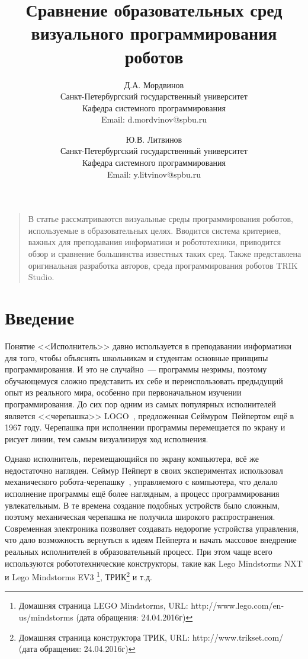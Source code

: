 \documentclass[a5paper]{article}
\title{Сравнение образовательных сред визуального программирования роботов}
\author{
	Д.А. Мордвинов \\
	Санкт-Петербургский государственный университет\\
	Кафедра системного программирования\\
	Email: d.mordvinov@spbu.ru
\and
	Ю.В. Литвинов \\
	Санкт-Петербургский государственный университет\\
	Кафедра системного программирования\\
	Email: y.litvinov@spbu.ru
}
\date{}
\begin{document}
\maketitle
\thispagestyle{empty}

\begin{quote}
\small\noindent В статье рассматриваются визуальные среды программирования роботов, используемые в образовательных целях.
Вводится система критериев, важных для преподавания информатики и робототехники, приводится обзор и сравнение большинства
известных таких сред. Также представлена оригинальная разработка авторов, среда программирования роботов TRIK Studio.
\end{quote}

\section*{Введение}
Понятие <<Исполнитель>> давно используется в преподавании информатики для того, чтобы объяснять школьникам и студентам 
основные принципы программирования. И это не случайно~--- программы незримы, поэтому обучающемуся сложно представить 
их себе и переиспользовать предыдущий опыт из реального мира, особенно при первоначальном изучении программирования. 
До сих пор одним из самых популярных исполнителей является <<черепашка>> LOGO~\cite{papert1980mindstorms}, 
предложенная Сеймуром~Пейпертом ещё в 1967 году. Черепашка при исполнении программы перемещается 
по экрану и рисует линии, тем самым визуализируя ход исполнения. 

Однако исполнитель, перемещающийся по экрану компьютера, всё же недостаточно нагляден. Сеймур Пейперт в своих 
экспериментах использовал механического робота-черепашку~\cite{papert1980mindstorms}, управляемого с 
компьютера, что делало исполнение программы ещё более наглядным, а процесс программирования увлекательным. 
В те времена создание подобных устройств было сложным, поэтому механическая черепашка не получила широкого 
распространения. Современная электроника позволяет создавать недорогие устройства управления, что дало 
возможность вернуться к идеям Пейперта и начать массовое внедрение реальных исполнителей в образовательный 
процесс. При этом чаще всего используются робототехнические 
конструкторы, такие как Lego Mindstorms NXT и Lego Mindstorms EV3%
\footnote{Домашняя страница LEGO Mindstorms, URL: http://www.lego.com/en-us/mindstorms (дата обращения: 24.04.2016г)}, 
ТРИК\footnote{Домашняя страница конструктора ТРИК, URL: http://www.trikset.com/ (дата обращения: 24.04.2016г)} и т.д.
\end{document}
